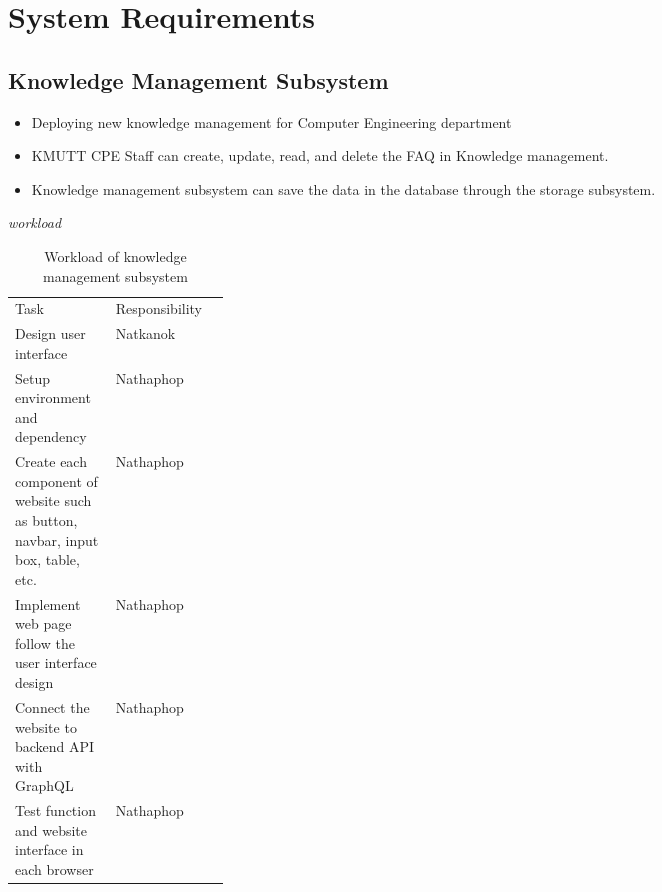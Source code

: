\documentclass[12pt,oneside,openright,a4paper]{cpe-english-project}
\begin{document}
\section{System Requirements}
	\subsection{Knowledge Management Subsystem}
	\begin{itemize}
		\item Deploying new knowledge management for Computer Engineering department
		\item KMUTT CPE Staff can create, update, read, and delete the FAQ in Knowledge management.
		\item Knowledge management subsystem can save the data in the database through the storage subsystem.
	\end{itemize}
\emph{workload}
\begin{table}[h]
	\centering
	\caption{Workload of knowledge management subsystem}
	\label{tab:Workload of knowledge management subsystem}
\begin{adjustbox}{width=\textwidth}
\begin{tabular}{lp{0.25\linewidth}l}
		\rowcolor[HTML]{5B9BD5} 
		Task                                                                              & Responsibility \\
		\rowcolor[HTML]{DEEAF6} 
		Design user interface                                                             & Natkanok       \\
		\rowcolor[HTML]{FFFFFF} 
		Setup environment and dependency                                                  & Nathaphop      \\
		\rowcolor[HTML]{DEEAF6} 
		Create each component of website such as button, navbar, input   box, table, etc. & Nathaphop      \\
		Implement web page follow the user interface   design                             & Nathaphop      \\
		\rowcolor[HTML]{DEEAF6} 
		Connect the website to backend API with   GraphQL                                 & Nathaphop      \\
		Test function and website interface in each   browser                             & Nathaphop      
	\end{tabular}
\end{adjustbox}
\end{table}
\end{document}
